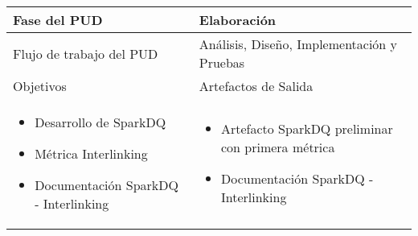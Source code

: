 \vspace{1cm}
\begin{tabular}{|p{}|p{}|}

\hline

\cellcolor[gray]{0.7}Fase del \acs{PUD} & Elaboración
 \\
\hline

\cellcolor[gray]{0.7}Flujo de trabajo del \acs{PUD} & Análisis, Diseño,
Implementación y Pruebas
 \\
\hline

\cellcolor[gray]{0.7}Objetivos  &
\cellcolor[gray]{0.7}Artefactos de Salida \\
\hline

\begin{itemize}
\item Desarrollo de SparkDQ
\item Métrica Interlinking
\item Documentación SparkDQ - Interlinking
\end{itemize}

&

\begin{itemize}
\item Artefacto SparkDQ preliminar con primera métrica
\item Documentación SparkDQ - Interlinking
\end{itemize}
\\
\hline
\end{tabular}


